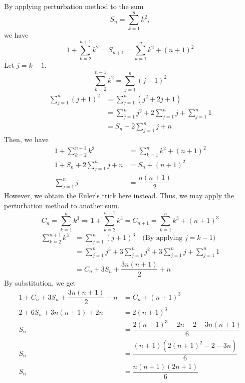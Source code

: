 \newpage
\begin{eg}
	By applying perturbation method to the sum
	\[
		S_n = \sum_{k = 1}^n k^2,
	\]
	we have
	\[
		1 + \sum_{k = 2}^{n + 1} k^2 = S_{n + 1} = \sum_{k = 1}^n  k^2 + (n + 1)^2 
	\]
	Let \(j = k - 1\),
	\[
		\sum_{k = 2}^{n + 1} k^2 = \sum_{j = 1}^{n} (j + 1)^2
	\]
	\[
	\begin{aligned}
		\sum_{j = 1}^{n} (j + 1)^2 &= \sum_{j = 1}^n (j^2 + 2j + 1) \\
		&=  \sum_{j = 1}^n j^2 + 2\sum_{j = 1}^n j + \sum_{j = 1}^n 1 \\
		&= S_n + 2\sum_{j = 1}^n j + n
	\end{aligned}
	\]
	Then, we have
	\[
		\begin{aligned}
			1 + \sum_{k = 2}^{n + 1} k^2 &= \sum_{k = 1}^n  k^2 + (n + 1)^2 \\
			1 + S_n + 2\sum_{j = 1}^n j + n& = S_n + (n + 1)^2 \\
			\sum_{j = 1}^n j &= \dfrac{n(n + 1)}{2}
		\end{aligned}
	\]
	However, we obtain the Euler\(^{\prime}\)s trick here instead. Thus, we may apply the perturbation method to another sum.
	\[
		C_n = \sum_{k = 1}^n k^3 \Rightarrow 1 + \sum_{k = 2}^{n + 1} k^3 = C_{n + 1} = \sum_{k = 1}^n  k^3 + (n + 1)^3
	\]
	\[
		\begin{aligned}
			\sum_{k = 2}^{n + 1} k^3 &= \sum_{j = 1}^n (j + 1)^3 \quad\text{(By applying \(j = k - 1\))} \\
			&= \sum_{j = 1}^n j^3 + 3\sum_{j = 1}^n j^2 + 3\sum_{j = 1}^n j + \sum_{j = 1}^n 1 \\
			&= C_n + 3S_n + \dfrac{3n(n + 1)}{2} + n
		\end{aligned}
	\]
	By substitution, we get
	\[
	\begin{aligned}
		1 + C_n + 3S_n + \dfrac{3n(n + 1)}{2} + n &= C_n + (n + 1)^3 \\
		2 + 6S_n + 3n(n + 1) + 2n &= 2(n + 1)^3 \\
		S_n &= \dfrac{2(n + 1)^3 - 2n - 2 - 3n(n + 1)}{6} \\
		S_n &= \dfrac{(n + 1)(2(n + 1)^{2} - 2 - 3n )}{6} \\
		S_n &= \dfrac{n(n + 1)(2n + 1)}{6}
	\end{aligned}
	\]
\end{eg}

